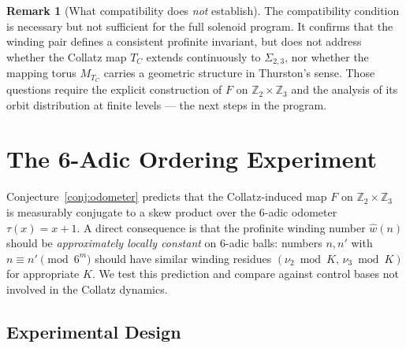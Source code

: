 \documentclass[11pt,a4paper]{article}
\newcommand{\Z}{\mathbb{Z}}
\theoremstyle{plain}
\theoremstyle{definition}
\newtheorem{remark}[theorem]{Remark}
\begin{document}
\begin{remark}[What compatibility does \emph{not} establish]
    The compatibility condition is necessary but not sufficient for
    the full solenoid program.  It confirms that the winding pair
    defines a consistent profinite invariant, but does not address
    whether the Collatz map $T_C$ extends continuously to
    $\Sigma_{2,3}$, nor whether the mapping torus $M_{T_C}$ carries
    a geometric structure in Thurston's sense.  Those questions require
    the explicit construction of $F$ on $\Z_2 \times \Z_3$ and the
    analysis of its orbit distribution at finite levels --- the next
    steps in the program.
\end{remark}

\section{The 6-Adic Ordering Experiment}\label{sec:sixadic}

Conjecture~\ref{conj:odometer} predicts that the Collatz-induced map $F$
on $\Z_2 \times \Z_3$ is measurably conjugate to a skew product over
the 6-adic odometer $\tau(x) = x + 1$.  A direct consequence is that
the profinite winding number $\hat{w}(n)$ should be \emph{approximately
locally constant} on 6-adic balls: numbers $n, n'$ with
$n \equiv n' \pmod{6^m}$ should have similar winding residues
$(\nu_2 \bmod K,\, \nu_3 \bmod K)$ for appropriate $K$.  We test this
prediction and compare against control bases not involved in the
Collatz dynamics.


\subsection{Experimental Design}
\end{document}
